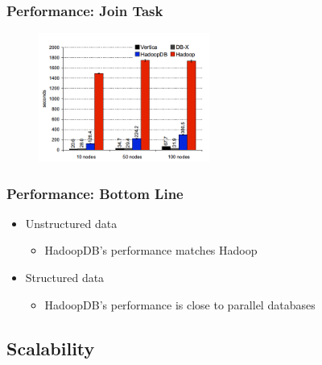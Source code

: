 \documentclass{beamer}
\begin{document}
\begin{frame}
  \frametitle{Performance: Join Task}
    \begin{figure}
    \centering
    \begin{center}
      \includegraphics[width=0.5\textwidth]{Performance-Joint-Task}
    \end{center}
    \caption{}
 \end{figure}

\end{frame}

\begin{frame}
  \frametitle{Performance: Bottom Line}
  \begin{itemize}
  \item Unstructured data
    \begin{itemize}
    \item HadoopDB’s performance matches Hadoop
    \end{itemize}
  \end{itemize}
  
  \begin{itemize}
  \item Structured data
    \begin{itemize}
    \item HadoopDB’s performance is close to parallel databases
    \end{itemize}
  \end{itemize}
\end{frame}

\subsection{Scalability}
\end{document}

